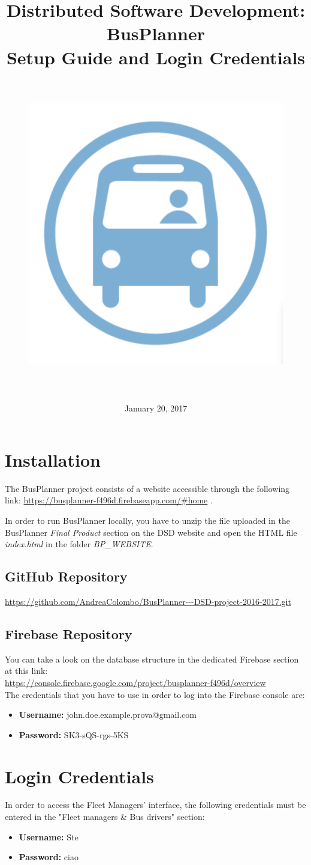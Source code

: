 \documentclass[a4paper, 12pt]{article}
\title{
	\textbf{D}istributed \textbf{S}oftware \textbf{D}evelopment: \textbf{BusPlanner}\\
	\textbf{Setup Guide and Login Credentials}\\
	\begin{figure}[H]
		\centering
		\includegraphics[width=13cm, height=13cm]{Bus_logo}
	\end{figure}
\date{January 20, 2017}
}
\begin{document}
	\maketitle
	
	\section{Installation}
	The BusPlanner project consists of a website accessible through the following link: \url{https://busplanner-f496d.firebaseapp.com/#home} .
	
	In order to run BusPlanner locally, you have to unzip the file uploaded in the BusPlanner \textit{Final Product} section on the DSD website and open the HTML file \textit{index.html} in the folder \textit{BP\_WEBSITE}.
	    \subsection{GitHub Repository}
	    \url{https://github.com/AndreaColombo/BusPlanner---DSD-project-2016-2017.git}
	    \subsection{Firebase Repository}
	    You can take a look on the database structure in the dedicated Firebase section at this link:\\ \url{https://console.firebase.google.com/project/busplanner-f496d/overview} \\
	    
	    The credentials that you have to use in order to log into the Firebase console are:
	    \begin{itemize}
	        \item \textbf{Username:} john.doe.example.prova@gmail.com 
	        \item \textbf{Password:} SK3-sQS-rgs-5KS
	    \end{itemize}
	    
	\section{Login Credentials}
	In order to access the Fleet Managers' interface, the following credentials must be entered in the "Fleet managers \& Bus drivers" section:
	\begin{itemize}
	       \item \textbf{Username:} Ste
	       \item \textbf{Password:} ciao
	\end{itemize}
	
\end{document}
